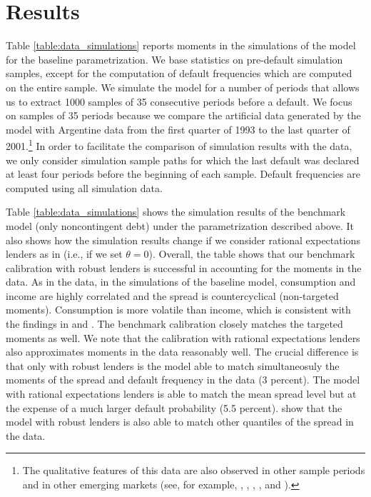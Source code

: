 \section{Results \label{sec:quantresults}}

Table \ref{table:data_simulations} reports moments in the simulations of the model for the baseline parametrization. We base statistics on pre-default simulation samples, except for the computation of default frequencies which are computed on the entire sample. We simulate the model for a number of periods that allows us to extract 1000 samples of 35 consecutive periods before a default. We focus on samples of 35 periods because we compare the artificial data generated by the model with Argentine data from the first quarter of 1993 to the last quarter of 2001.\footnote{The qualitative features of this data are also observed in other sample periods and in other emerging markets (see, for example, \citealp{AG_cycles}, \citealp{Alvarez}, \citealp{Bora}, \citealp{Neumeyer05}, and \citealp{drives}).} In order to facilitate the comparison of simulation results with the data, we only consider simulation sample paths for which the last default was declared at least four periods before the beginning of each sample. Default frequencies are computed using all simulation data.

Table \ref{table:data_simulations} shows the simulation results of the benchmark model (only noncontingent debt) under the parametrization described above. It also shows how the simulation results change if we consider rational expectations lenders as in \cite{Chatty} (i.e., if we set $\theta=0$). Overall, the table shows that our benchmark calibration with robust lenders is successful in accounting for the moments in the data. As in the data, in the simulations of the baseline model, consumption and income are highly correlated and the spread is countercyclical (non-targeted moments). Consumption is more volatile than income, which is consistent with the findings in \cite{Neumeyer05} and \cite{AG_cycles}. The benchmark calibration closely matches the targeted moments as well. We note that the calibration with rational expectations lenders also approximates moments in the data reasonably well. The crucial difference is that only with robust lenders is the model able to match simultaneosuly the moments of the spread and default frequency in the data (3 percent). The model with rational expectations lenders is able to match the mean spread level but at the expense of a much larger default probability (5.5 percent). \cite{PouzoPresno2016} show that the model with robust lenders is also able to match other quantiles of the spread in the data.

